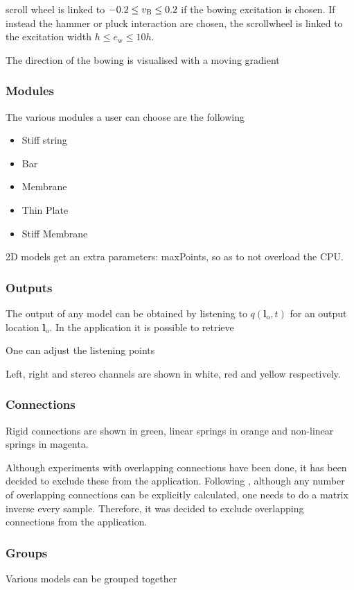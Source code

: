 \documentclass{article}
\begin{document}
scroll wheel is linked to $-0.2 \leq v_{\text{B}} \leq 0.2$ if the bowing excitation is chosen. If instead the hammer or pluck interaction are chosen, the scrollwheel is linked to the excitation width $h \leq e_\text{w} \leq 10 h$. 

The direction of the bowing is visualised with a moving gradient 


\subsubsection{Modules}
The various modules a user can choose are the following
\begin{itemize}
    \item Stiff string
    \item Bar
    \item Membrane
    \item Thin Plate
    \item Stiff Membrane
\end{itemize}

2D models get an extra parameters: maxPoints, so as to not overload the CPU.

\subsubsection{Outputs}
The output of any model can be obtained by listening to $q(\boldsymbol{l}_\text{o}, t)$ for an output location $\boldsymbol{l}_\text{o}$. In the application it is possible to retrieve 

One can adjust the listening points 

Left, right and stereo channels are shown in white, red and yellow respectively. 

\subsubsection{Connections}
Rigid connections are shown in green, linear springs in orange and non-linear springs in magenta. 

Although experiments with overlapping connections have been done, it has been decided to exclude these from the application. Following \cite{Bilbao2009Modular}, although any number of overlapping connections can be explicitly calculated, one needs to do a matrix inverse every sample. Therefore, it was decided to exclude overlapping connections from the application. 


\subsubsection{Groups}
Various models can be grouped together
\end{document}
